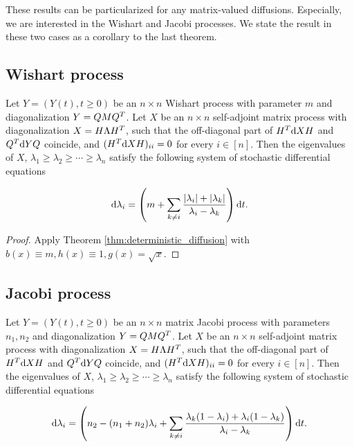 These results can be particularized for any matrix-valued diffusions. Especially, we are interested in the Wishart and Jacobi processes. We state the result in these two cases as a corollary to the last theorem.

\subsection{Wishart process}

\begin{corollary}
    Let $Y = (Y(t), t \ge 0)$ be an $n\times n$ Wishart process with parameter $m$ and diagonalization $Y = QMQ^T$. Let $X$ be an $n\times n$ self-adjoint matrix process with diagonalization $X = H \Lambda H^T$, such that the off-diagonal part of $H^T \mathrm d X H $ and $Q^T \mathrm d Y Q$ coincide, and $(H^T \mathrm d X H)_{ii} = 0$ for every $i \in [n]$. Then the eigenvalues of $X$, $\lambda_1 \ge \lambda_2 \ge \cdots \ge \lambda_n$ satisfy the following system of stochastic differential equations

    \begin{equation} \label{eq:deterministic_wishart}
        \mathrm d \lambda_i = \left( m +\sum_{k\neq i} \frac{ \lvert \lambda_i \rvert + \lvert \lambda_k \rvert }{\lambda_i - \lambda_k}\right)\mathrm d t.
    \end{equation}
\end{corollary}

\begin{proof}
    Apply Theorem \ref{thm:deterministic_diffusion} with $b(x)\equiv m, h(x)\equiv 1, g(x)=\sqrt{x} $. 
\end{proof}


\subsection{Jacobi process}

\begin{corollary}
    Let $Y = (Y(t), t \ge 0)$ be an $n\times n$ matrix Jacobi process with parameters $n_1,n_2$ and diagonalization $Y = QMQ^T$. Let $X$ be an $n\times n$ self-adjoint matrix process with diagonalization $X = H \Lambda H^T$, such that the off-diagonal part of $H^T \mathrm d X H $ and $Q^T \mathrm d Y Q$ coincide, and $(H^T \mathrm d X H)_{ii} = 0$ for every $i \in [n]$. Then the eigenvalues of $X$, $\lambda_1 \ge \lambda_2 \ge \cdots \ge \lambda_n$ satisfy the following system of stochastic differential equations

    \begin{equation} \label{eq:deterministic_jacobi}
        \mathrm d \lambda_i = \left( n_2 - (n_1 + n_2)\lambda_i + \sum_{k\neq i} \frac{\lambda_k(1-\lambda_i) + \lambda_i(1-\lambda_k)}{\lambda_i - \lambda_k} \right)\mathrm d t.
    \end{equation}
\end{corollary}

